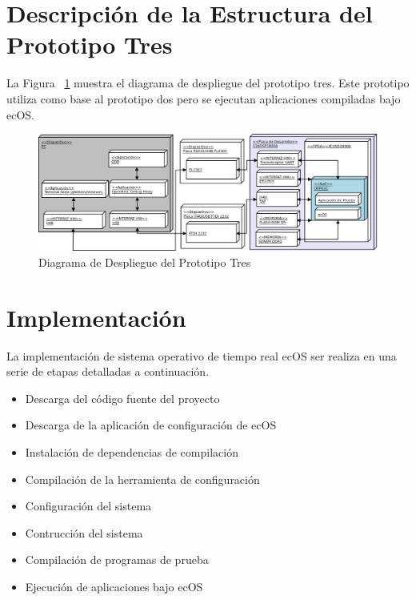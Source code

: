 \newpage
		
		\section{Descripción de la Estructura del Prototipo Tres}
		La Figura ~\ref{fig:ecos} muestra el diagrama de despliegue del prototipo tres. Este prototipo utiliza como base al prototipo dos pero se ejecutan 
		aplicaciones compiladas bajo ecOS.
		
		\begin{figure}[h!]
 		\begin{center}
  		\includegraphics[width=1\textwidth,keepaspectratio=true]{./images/ecos}
  		\caption{Diagrama de Despliegue del Prototipo Tres}
  		\label{fig:ecos} 
 		\end{center}
		\end{figure}
	
		\section{Implementación}	
		
		La implementación de sistema operativo de tiempo real ecOS ser realiza en una serie de etapas detalladas a continuación. 
		\begin {itemize}
		\item Descarga del código fuente del proyecto
		\item Descarga de la aplicación de configuración de ecOS
		\item Instalación de dependencias de compilación
		\item Compilación de la herramienta de configuración
		\item Configuración del sistema
		\item Contrucción del sistema 
		\item Compilación de programas de prueba
		\item Ejecución de aplicaciones bajo ecOS
 		\end {itemize}
 
